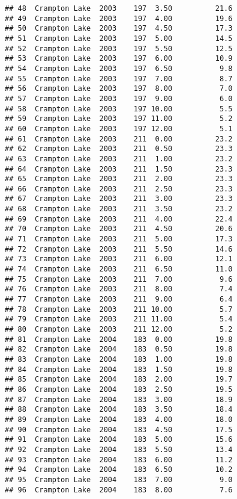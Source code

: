 \documentclass[
]{article}
\begin{document}
\begin{verbatim}
## 48  Crampton Lake  2003    197  3.50          21.6
## 49  Crampton Lake  2003    197  4.00          19.6
## 50  Crampton Lake  2003    197  4.50          17.3
## 51  Crampton Lake  2003    197  5.00          14.5
## 52  Crampton Lake  2003    197  5.50          12.5
## 53  Crampton Lake  2003    197  6.00          10.9
## 54  Crampton Lake  2003    197  6.50           9.8
## 55  Crampton Lake  2003    197  7.00           8.7
## 56  Crampton Lake  2003    197  8.00           7.0
## 57  Crampton Lake  2003    197  9.00           6.0
## 58  Crampton Lake  2003    197 10.00           5.5
## 59  Crampton Lake  2003    197 11.00           5.2
## 60  Crampton Lake  2003    197 12.00           5.1
## 61  Crampton Lake  2003    211  0.00          23.2
## 62  Crampton Lake  2003    211  0.50          23.3
## 63  Crampton Lake  2003    211  1.00          23.2
## 64  Crampton Lake  2003    211  1.50          23.3
## 65  Crampton Lake  2003    211  2.00          23.3
## 66  Crampton Lake  2003    211  2.50          23.3
## 67  Crampton Lake  2003    211  3.00          23.3
## 68  Crampton Lake  2003    211  3.50          23.2
## 69  Crampton Lake  2003    211  4.00          22.4
## 70  Crampton Lake  2003    211  4.50          20.6
## 71  Crampton Lake  2003    211  5.00          17.3
## 72  Crampton Lake  2003    211  5.50          14.6
## 73  Crampton Lake  2003    211  6.00          12.1
## 74  Crampton Lake  2003    211  6.50          11.0
## 75  Crampton Lake  2003    211  7.00           9.6
## 76  Crampton Lake  2003    211  8.00           7.4
## 77  Crampton Lake  2003    211  9.00           6.4
## 78  Crampton Lake  2003    211 10.00           5.7
## 79  Crampton Lake  2003    211 11.00           5.4
## 80  Crampton Lake  2003    211 12.00           5.2
## 81  Crampton Lake  2004    183  0.00          19.8
## 82  Crampton Lake  2004    183  0.50          19.8
## 83  Crampton Lake  2004    183  1.00          19.8
## 84  Crampton Lake  2004    183  1.50          19.8
## 85  Crampton Lake  2004    183  2.00          19.7
## 86  Crampton Lake  2004    183  2.50          19.5
## 87  Crampton Lake  2004    183  3.00          18.9
## 88  Crampton Lake  2004    183  3.50          18.4
## 89  Crampton Lake  2004    183  4.00          18.0
## 90  Crampton Lake  2004    183  4.50          17.5
## 91  Crampton Lake  2004    183  5.00          15.6
## 92  Crampton Lake  2004    183  5.50          13.4
## 93  Crampton Lake  2004    183  6.00          11.2
## 94  Crampton Lake  2004    183  6.50          10.2
## 95  Crampton Lake  2004    183  7.00           9.0
## 96  Crampton Lake  2004    183  8.00           7.6

\end{verbatim}
\end{document}
